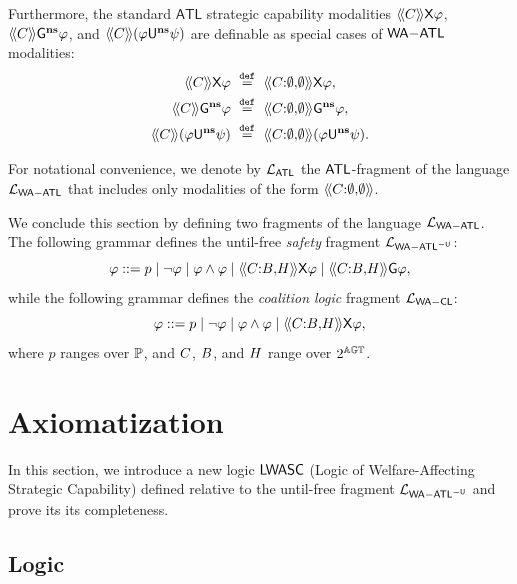 \documentclass{article}
\begin{document}
Furthermore, the standard $\mathsf{ATL}$ strategic capability modalities 
$\langle\!\langle C \rangle\!\rangle \mathsf{X} \varphi$, 
$\langle\!\langle C \rangle\!\rangle \mathsf{G}^{\mathbf{ns}} \varphi$, and 
$\langle\!\langle C \rangle\!\rangle (\varphi \mathsf{U}^{\mathbf{ns}} \psi)$
are definable as special cases of $\mathsf{WA{-}ATL}$ modalities:
\begin{align*}
    \atlop{\Coalition} \nexttime \varphi &\eqdef \atlbh{\Coalition}{\emptyset}{\emptyset} \nexttime \varphi,\\
    \atlop{\Coalition} \henceforth^\ns \varphi &\eqdef \atlbh{\Coalition}{\emptyset}{\emptyset} \henceforth^\ns \varphi,\\
    \atlop{\Coalition} (\varphi \U^\ns \psi) &\eqdef \atlbh{\Coalition}{\emptyset}{\emptyset} (\varphi \U^\ns \psi).
\end{align*}

For notational convenience, we denote by $\mathcal{L}_{\mathsf{ATL}}$ the $\mathsf{ATL}$-fragment of the language $\mathcal{L}_{\mathsf{WA{-}ATL}}$ that includes only modalities of the form $\langle\!\langle C{:}\emptyset{,}\emptyset  \rangle\!\rangle$.

We conclude this section by defining two   fragments of the language $\mathcal{L}_{\mathsf{WA{-}ATL}}$. 
The following grammar defines the
until-free 
\emph{safety} fragment 
$\mathcal{L}_{\mathsf{WA{-}ATL}^{-\mathsf{U}}}$:
\[
\varphi  ::= p \mid \neg\varphi \mid \varphi \wedge \varphi 
\mid \langle\!\langle C{:}B{,}H  \rangle\!\rangle \mathsf{X} \varphi 
\mid \langle\!\langle C{:}B{,}H  \rangle\!\rangle \mathsf{G} \varphi,
\]
while the following grammar defines the \emph{coalition logic} fragment 
$\mathcal{L}_{\mathsf{WA{-}CL}}$:
\[
\varphi  ::= p \mid \neg\varphi \mid \varphi \wedge \varphi 
\mid \langle\!\langle C{:}B{,}H  \rangle\!\rangle \mathsf{X} \varphi,
\]
where $p$ ranges over $\mathbb{P}$, and $C$, $B$, and $H$ range over $2^{\mathbb{AGT}}$.









 



\section{Axiomatization}
\label{sec:axiom}

In this section, 
we introduce a new logic
$\mathsf{LWASC}$
(Logic of Welfare-Affecting Strategic Capability) 
defined relative to the  until-free fragment 
$\mathcal{L}_{\mathsf{WA{-}ATL}^{-\mathsf{U}}}$
and prove its its completeness. 
 

\subsection{Logic}\label{subsec: axiomatization}
\end{document}
